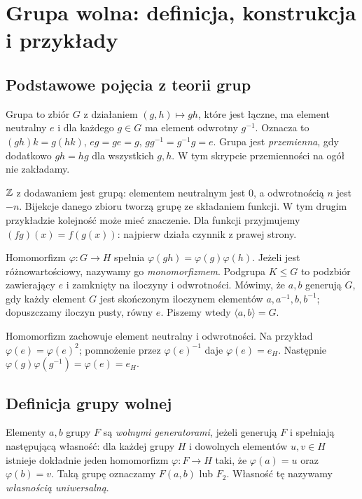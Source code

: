 \section{Grupa wolna: definicja, konstrukcja i przykłady}
\subsection{Podstawowe pojęcia z teorii grup}
\begin{definicja}[Grupa]
Grupa to zbiór $G$ z działaniem $(g,h)\mapsto gh$, które jest łączne, ma element neutralny $e$ i dla każdego $g\in G$ ma element odwrotny $g^{-1}$. Oznacza to $(gh)k=g(hk)$, $eg=ge=g$, $gg^{-1}=g^{-1}g=e$. Grupa jest \emph{przemienna}, gdy dodatkowo $gh=hg$ dla wszystkich $g,h$. W tym skrypcie przemienności na ogół nie zakładamy.
\end{definicja}
\begin{przyklad}
$\mathbb Z$ z dodawaniem jest grupą: elementem neutralnym jest $0$, a odwrotnością $n$ jest $-n$. Bijekcje danego zbioru tworzą grupę ze składaniem funkcji. W tym drugim przykładzie kolejność może mieć znaczenie. Dla funkcji przyjmujemy $(fg)(x)=f(g(x))$: najpierw działa czynnik z prawej strony.
\end{przyklad}
\begin{definicja}
Homomorfizm $\varphi:G\to H$ spełnia $\varphi(gh)=\varphi(g)\varphi(h)$. Jeżeli jest różnowartościowy, nazywamy go \emph{monomorfizmem}. Podgrupa $K\le G$ to podzbiór zawierający $e$ i zamknięty na iloczyny i odwrotności. Mówimy, że $a,b$ generują $G$, gdy każdy element $G$ jest skończonym iloczynem elementów $a,a^{-1},b,b^{-1}$; dopuszczamy iloczyn pusty, równy $e$. Piszemy wtedy $\langle a, b\rangle=G.$
\end{definicja}
Homomorfizm zachowuje element neutralny i odwrotności. Na przykład $\varphi(e)=\varphi(e)^2$; pomnożenie przez $\varphi(e)^{-1}$ daje $\varphi(e)=e_H$. Następnie $\varphi(g)\varphi(g^{-1})=\varphi(e)=e_H$.

\subsection{Definicja grupy wolnej}
\begin{definicja}
\label{def:grupa-wolna}
Elementy $a,b$ grupy $F$ są \emph{wolnymi generatorami},
jeżeli generują $F$ i spełniają następującą własność: dla każdej grupy
$H$ i dowolnych elementów $u,v\in H$ istnieje dokładnie jeden homomorfizm
$\varphi:F\to H$ taki, że $\varphi(a)=u$ oraz $\varphi(b)=v$.
Taką grupę oznaczamy $F(a,b)$ lub $F_2$. Własność tę nazywamy
\emph{własnością uniwersalną}.
\end{definicja}

